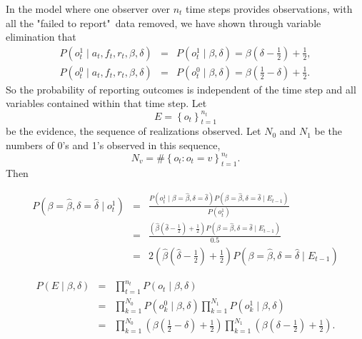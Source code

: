 \documentclass{amsart}
\theoremstyle{definition}
\theoremstyle{plain}
\numberwithin{equation}{section}
\begin{document}
In the model where one observer over $n_{t}$ time steps provides
observations, with all the "failed to report"\ data removed, we have shown
through variable elimination that 
\begin{eqnarray*}
P\left( o_{t}^{1}\mid a_{t},f_{t},r_{t},\beta ,\delta \right)  &=&P\left(
o_{t}^{1}\mid \beta ,\delta \right) =\beta \left( \delta -\frac{1}{2}\right)
+\frac{1}{2}, \\
P\left( o_{t}^{0}\mid a_{t},f_{t},r_{t},\beta ,\delta \right)  &=&P\left(
o_{t}^{0}\mid \beta ,\delta \right) =\beta \left( \frac{1}{2}-\delta \right)
+\frac{1}{2}.
\end{eqnarray*}%
So the probability of reporting outcomes is independent of the time step and
all variables contained within that time step. Let 
\begin{equation*}
E=\left\{ o_{t}\right\} _{t=1}^{n_{t}}
\end{equation*}%
be the evidence, the sequence of realizations observed. Let $N_{0}$ and $%
N_{1}$ be the numbers of 0's and 1's observed in this sequence,%
\begin{equation*}
N_{v}=\#\left\{ o_{t}:o_{t}=v\right\} _{t=1}^{n_{t}}.
\end{equation*}%
Then

\begin{eqnarray*}
P\left( \beta =\hat{\beta},\delta =\hat{\delta}\mid o_{t}^{1}\right)  &=&%
\frac{P\left( o_{t}^{1}\mid \beta =\hat{\beta},\delta =\hat{\delta}\right)
P\left( \beta =\hat{\beta},\delta =\hat{\delta}\mid E_{t-1}\right) }{P\left(
o_{t}^{1}\right) } \\
&=&\frac{\left( \hat{\beta}\left( \hat{\delta}-\frac{1}{2}\right) +\frac{1}{2%
}\right) P\left( \beta =\hat{\beta},\delta =\hat{\delta}\mid E_{t-1}\right) 
}{0.5} \\
&=&2\left( \hat{\beta}\left( \hat{\delta}-\frac{1}{2}\right) +\frac{1}{2}%
\right) P\left( \beta =\hat{\beta},\delta =\hat{\delta}\mid E_{t-1}\right) 
\end{eqnarray*}

\bigskip 
\begin{eqnarray*}
P\left( E\mid \beta ,\delta \right)  &=&\prod_{t=1}^{n_{t}}P\left( o_{t}\mid
\beta ,\delta \right)  \\
&=&\prod_{k=1}^{N_{0}}P\left( o_{k}^{0}\mid \beta ,\delta \right)
\prod_{k=1}^{N_{1}}P\left( o_{k}^{1}\mid \beta ,\delta \right)  \\
&=&\prod_{k=1}^{N_{0}}\left( \beta \left( \frac{1}{2}-\delta \right) +\frac{1%
}{2}\right) \prod_{k=1}^{N_{1}}\left( \beta \left( \delta -\frac{1}{2}%
\right) +\frac{1}{2}\right) .
\end{eqnarray*}
\end{document}

